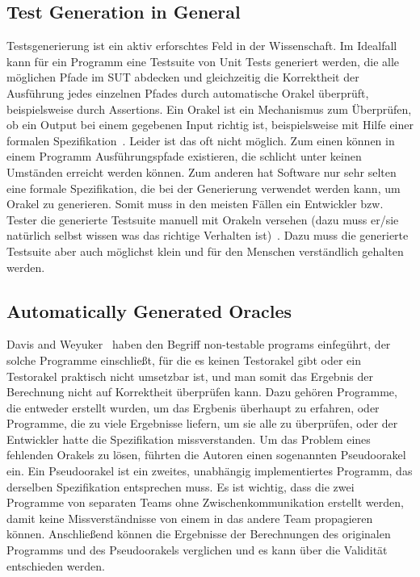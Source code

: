 \documentclass{article}
\begin{document}
\subsection{Test Generation in General}
Testsgenerierung ist ein aktiv erforschtes Feld in der Wissenschaft. Im Idealfall kann für ein Programm eine Testsuite von Unit Tests generiert werden, die alle möglichen Pfade im SUT abdecken und gleichzeitig die Korrektheit der Ausführung jedes einzelnen Pfades durch automatische Orakel überprüft, beispielsweise durch Assertions. Ein Orakel ist ein Mechanismus zum Überprüfen, ob ein Output bei einem gegebenen Input richtig ist, beispielsweise mit Hilfe einer formalen Spezifikation~\cite{10.1145/1569901.1570127}. Leider ist das oft nicht möglich. Zum einen können in einem Programm Ausführungspfade existieren, die schlicht unter keinen Umständen erreicht werden können. Zum anderen hat Software nur sehr selten eine formale Spezifikation, die bei der Generierung verwendet werden kann, um Orakel zu generieren. Somit muss in den meisten Fällen ein Entwickler bzw. Tester die generierte Testsuite manuell mit Orakeln versehen (dazu muss er/sie natürlich selbst wissen was das richtige Verhalten ist)~\cite{Fraser_2013}. Dazu muss die generierte Testsuite aber auch möglichst klein und für den Menschen verständlich gehalten werden. 

\subsection{Automatically Generated Oracles}
Davis and Weyuker~\cite{10.1145/800175.809889} haben den Begriff non-testable programs einfegührt, der solche Programme einschließt, für die es keinen Testorakel gibt oder ein Testorakel praktisch nicht umsetzbar ist, und man somit das Ergebnis der Berechnung nicht auf Korrektheit überprüfen kann. Dazu gehören Programme, die entweder erstellt wurden, um das Ergbenis überhaupt zu erfahren, oder Programme, die zu viele Ergebnisse liefern, um sie alle zu überprüfen, oder der Entwickler hatte die Spezifikation missverstanden. Um das Problem eines fehlenden Orakels zu lösen, führten die Autoren einen sogenannten Pseudoorakel ein. Ein Pseudoorakel ist ein zweites, unabhängig implementiertes Programm, das derselben Spezifikation entsprechen muss. Es ist wichtig, dass die zwei Programme von separaten Teams ohne Zwischenkommunikation erstellt werden, damit keine Missverständnisse von einem in das andere Team propagieren können. Anschließend können die Ergebnisse der Berechnungen des originalen Programms und des Pseudoorakels verglichen und es kann über die Validität entschieden werden. 
\end{document}
